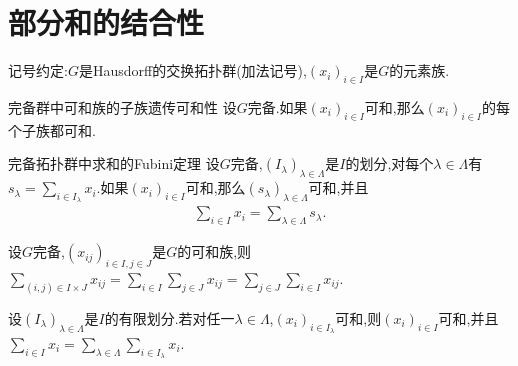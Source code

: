 \section{部分和的结合性}

记号约定:$G$是Hausdorff的交换拓扑群(加法记号),$\left(x_{i}\right)_{i\in I}$是$G$的元素族.

\begin{proposition}{完备群中可和族的子族遗传可和性}{}
	设$G$完备.如果$\left(x_{i}\right)_{i\in I}$可和,那么$\left(x_{i}\right)_{i\in I}$的每个子族都可和.
\end{proposition}

\begin{theorem}{完备拓扑群中求和的Fubini定理}{}
	设$G$完备,$\left(I_{\lambda}\right)_{\lambda\in\Lambda}$是$I$的划分,对每个$\lambda\in\Lambda$有$s_{\lambda}=\sum\limits_{i\in I_{\lambda}}x_{i}$.如果$\left(x_{i}\right)_{i\in I}$可和,那么$\left(s_{\lambda}\right)_{\lambda\in\Lambda}$可和,并且
	\begin{align*}
		\sum\limits_{i\in I}x_{i}=\sum\limits_{\lambda\in\Lambda}s_{\lambda}.
	\end{align*}
\end{theorem}

\begin{corollary}{}{}
	设$G$完备,$\left(x_{ij}\right)_{i\in I,j\in J}$是$G$的可和族,则$\sum\limits_{\left(i,j\right)\in I\times J}x_{ij}=\sum\limits_{i\in I}\sum\limits_{j\in J}x_{ij}=\sum\limits_{j\in J}\sum\limits_{i\in I}x_{ij}$.
\end{corollary}

\begin{proposition}{}{}
	设$\left(I_{\lambda}\right)_{\lambda\in\Lambda}$是$I$的有限划分.若对任一$\lambda\in\Lambda$,$\left(x_{i}\right)_{i\in I_{\lambda}}$可和,则$\left(x_{i}\right)_{i\in I}$可和,并且$\sum\limits_{i\in I}x_{i}=\sum\limits_{\lambda\in\Lambda}\sum\limits_{i\in I_{\lambda}}x_{i}$.
\end{proposition}